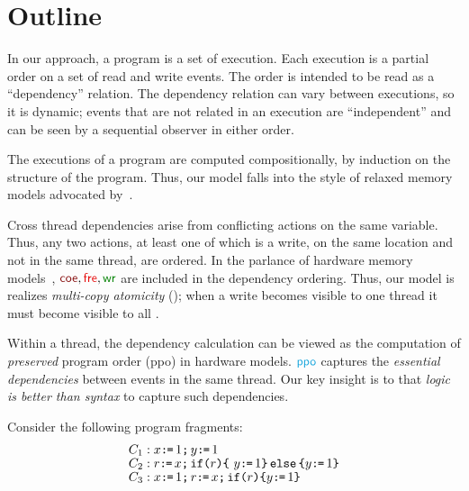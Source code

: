 \section{Outline}

In our approach, a program is a set of execution.  Each execution is a
partial order on a set of read and write events.  The order is intended to be
read as a ``dependency'' relation.  The dependency relation can vary between
executions, so it is dynamic; events that are not related in an execution are
``independent'' and can be seen by a sequential observer in either order.

The executions of a program are computed compositionally, by induction on the
structure of the program.  Thus, our model falls into the style of relaxed
memory models advocated by~\citet{Batty17}.

Cross thread dependencies arise from conflicting actions on the same
variable.  Thus, any two actions, at least one of which is a write, on the
same location and not in the same thread, are ordered.  In the parlance of
hardware memory models~\citep{alglave}, $\rcoe,\rfre,\rrfe$ are included in
the dependency ordering.  Thus, our model is realizes \emph{multi-copy
  atomicity} (\mca); when a write becomes visible to one thread it must
become visible to all
\citep{DBLP:journals/pacmpl/PulteFDFSS18}.
  

Within a thread, the dependency calculation can be viewed as the computation
of \emph{preserved} program order (\textsf{ppo}) in hardware models.  $\rppo$
captures the \emph{essential dependencies} between events in the same thread.
Our key insight is to that \emph{logic is better than syntax} to capture such
dependencies.

Consider the following program fragments: \begingroup \allowdisplaybreaks
\begin{align*}
  & C_1: x \texttt{:}\mkern-1mu\texttt{=}\, 1 \texttt{;}\,\allowbreak y \texttt{:}\mkern-1mu\texttt{=}\, 1
  \\[-1ex] & C_2: r \texttt{:}\mkern-1mu\texttt{=}\, x \texttt{;}\,\allowbreak \texttt{if}\allowbreak\texttt{(}r\texttt{)} \allowbreak\texttt{\{}\ y \texttt{:}\mkern-1mu\texttt{=}\, 1 \texttt{\}}\,\allowbreak\texttt{else}\allowbreak\,\texttt{\{} y \texttt{:}\mkern-1mu\texttt{=}\, 1  \texttt{\}}
  \\[-1ex] & C_3: x \texttt{:}\mkern-1mu\texttt{=}\, 1 \texttt{;}\,\allowbreak r \texttt{:}\mkern-1mu\texttt{=}\, x \texttt{;}\,\allowbreak \texttt{if}\allowbreak\texttt{(}r\texttt{)} \allowbreak\texttt{\{} y \texttt{:}\mkern-1mu\texttt{=}\, 1 \texttt{\}}
\end{align*}
\endgroup

